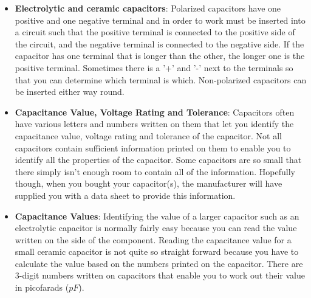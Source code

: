 \documentclass{report}
\begin{document}
\begin{itemize}
\begin{itemize}
                \item Non-polarized
                    \begin{itemize}
                        \item Ceramic
                        \item Vacuum, air, glass, silicon
                        \item Film
                    \end{itemize}
            \end{itemize}
            \bigbreak \noindent 
        \item \textbf{Electrolytic and ceramic capacitors}: Polarized capacitors have one positive and one negative terminal and in order to work must be inserted into a circuit such that the positive terminal is connected to the positive side of the circuit, and the negative terminal is connected to the negative side. If the capacitor has one terminal that is longer than the other, the longer one is the positive terminal. Sometimes there is a '+' and '-' next to the terminals so that you can determine which terminal is which.
            \bigbreak \noindent 
            Non-polarized capacitors can be inserted either way round.
            \bigbreak \noindent 
        \item \textbf{Capacitance Value, Voltage Rating and Tolerance}: Capacitors often have various letters and numbers written on them that let you identify the capacitance value, voltage rating and tolerance of the capacitor.
            \bigbreak \noindent 
            Not all capacitors contain sufficient information printed on them to enable you to identify all the properties of the capacitor. Some capacitors are so small that there simply isn't enough room to contain all of the information. Hopefully though, when you bought your capacitor(s), the manufacturer will have supplied you with a data sheet to provide this information.
        \item \textbf{Capacitance Values}: Identifying the value of a larger capacitor such as an electrolytic capacitor is normally fairly easy because you can read the value written on the side of the component.
            \bigbreak \noindent 
            Reading the capacitance value for a small ceramic capacitor is not quite so straight forward because you have to calculate the value based on the numbers printed on the capacitor.
            \bigbreak \noindent 
            There are 3-digit numbers written on capacitors that enable you to work out their value in picofarads ($pF$).

\end{itemize}
\end{document}
